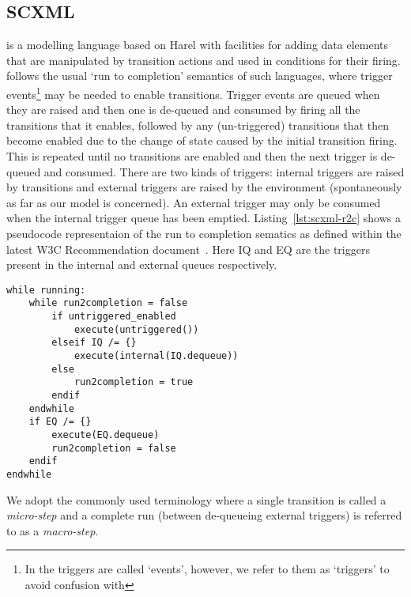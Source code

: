 

\subsection{SCXML}
\label{sec:scxml}

\SCXML is a modelling language based on Harel \statecharts with facilities for adding data elements that are manipulated by transition actions and used in conditions for their firing. \SCXML follows the usual `run to completion' semantics of such \statechart languages, where trigger events\footnote{In \SCXML the triggers are called `events', however, we refer to them as `triggers' to avoid confusion with \EventB} may be needed to enable transitions. Trigger events are queued when they are raised and then one is de-queued and consumed by firing all the transitions that it enables, followed by any (un-triggered) transitions that then become enabled due to the change of state caused by the initial transition firing. This is repeated until no transitions are enabled and then the next trigger is de-queued and consumed. There are two kinds of triggers: internal triggers are raised by transitions and external triggers are raised by the environment (spontaneously as far as our model is concerned). An external trigger may only be consumed when the internal trigger queue has been emptied. Listing~\ref{lst:scxml-r2c} shows a pseudocode representaion of the run to completion sematics as defined within the latest W3C Recommendation document~\cite{scxmlwebsite}. Here IQ and EQ are the triggers present in the internal and external queues respectively. 

\begin{lstlisting}[caption=Pseudocode for 'run to completion',label={lst:scxml-r2c}, frame=single, float=t]
while running:
	while run2completion = false
		if untriggered_enabled
			execute(untriggered())
		elseif IQ /= {}
			execute(internal(IQ.dequeue)) 
		else
			run2completion = true
		endif
	endwhile
	if EQ /= {}
		execute(EQ.dequeue) 
		run2completion = false
	endif
endwhile 
\end{lstlisting}

We adopt the commonly used terminology where a single transition is called a \emph{micro-step} and a complete run (between de-queueing external triggers) is referred to as a \emph{macro-step}.

